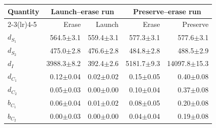 \begingroup
\setlength{\tabcolsep}{3pt}
\begin{tabular}{@{}lrrrr@{}}
\toprule
Quantity & \multicolumn{2}{c}{Launch--erase run} & \multicolumn{2}{c}{Preserve--erase run} \\
\cmidrule(lr){2-3}\cmidrule(lr){4-5}
 & Erase & Launch & Erase & Preserve \\
\midrule
$d_{S_1}$ & 564.5\ensuremath{\pm}3.1 & 559.4\ensuremath{\pm}3.1 & 577.3\ensuremath{\pm}3.1 & 577.6\ensuremath{\pm}3.1 \\
$d_{S_2}$ & 475.0\ensuremath{\pm}2.8 & 476.6\ensuremath{\pm}2.8 & 484.8\ensuremath{\pm}2.8 & 488.5\ensuremath{\pm}2.9 \\
$d_I$ & 3988.3\ensuremath{\pm}8.2 & 392.4\ensuremath{\pm}2.6 & 5181.7\ensuremath{\pm}9.3 & 14097.8\ensuremath{\pm}15.3 \\
$d_{C_1}$ & 0.12\ensuremath{\pm}0.04 & 0.02\ensuremath{\pm}0.02 & 0.15\ensuremath{\pm}0.05 & 0.40\ensuremath{\pm}0.08 \\
$d_{C_2}$ & 0.05\ensuremath{\pm}0.03 & 0.00\ensuremath{\pm}0.00 & 0.10\ensuremath{\pm}0.04 & 0.37\ensuremath{\pm}0.08 \\
$b_{C_1}$ & 0.06\ensuremath{\pm}0.04 & 0.01\ensuremath{\pm}0.02 & 0.08\ensuremath{\pm}0.05 & 0.20\ensuremath{\pm}0.08 \\
$b_{C_2}$ & 0.00\ensuremath{\pm}0.03 & 0.00\ensuremath{\pm}0.00 & 0.04\ensuremath{\pm}0.04 & 0.19\ensuremath{\pm}0.08 \\
\bottomrule
\end{tabular}
\endgroup
